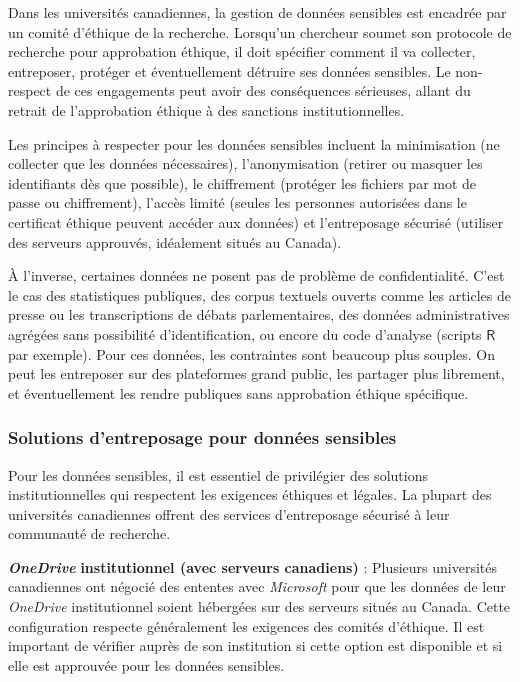 \documentclass[
  letterpaper,
  DIV=11,
  numbers=noendperiod,
  oneside]{scrreprt}
\begin{document}
Dans les universités canadiennes, la gestion de données sensibles est
encadrée par un comité d'éthique de la recherche. Lorsqu'un chercheur
soumet son protocole de recherche pour approbation éthique, il doit
spécifier comment il va collecter, entreposer, protéger et
éventuellement détruire ses données sensibles. Le non-respect de ces
engagements peut avoir des conséquences sérieuses, allant du retrait de
l'approbation éthique à des sanctions institutionnelles.

Les principes à respecter pour les données sensibles incluent la
minimisation (ne collecter que les données nécessaires), l'anonymisation
(retirer ou masquer les identifiants dès que possible), le chiffrement
(protéger les fichiers par mot de passe ou chiffrement), l'accès limité
(seules les personnes autorisées dans le certificat éthique peuvent
accéder aux données) et l'entreposage sécurisé (utiliser des serveurs
approuvés, idéalement situés au Canada).

À l'inverse, certaines données ne posent pas de problème de
confidentialité. C'est le cas des statistiques publiques, des corpus
textuels ouverts comme les articles de presse ou les transcriptions de
débats parlementaires, des données administratives agrégées sans
possibilité d'identification, ou encore du code d'analyse (scripts
\(\textsf{R}\) par exemple). Pour ces données, les contraintes sont
beaucoup plus souples. On peut les entreposer sur des plateformes grand
public, les partager plus librement, et éventuellement les rendre
publiques sans approbation éthique spécifique.

\hypertarget{solutions-dentreposage-pour-donnuxe9es-sensibles}{%
\subsubsection{Solutions d'entreposage pour données
sensibles}\label{solutions-dentreposage-pour-donnuxe9es-sensibles}}

Pour les données sensibles, il est essentiel de privilégier des
solutions institutionnelles qui respectent les exigences éthiques et
légales. La plupart des universités canadiennes offrent des services
d'entreposage sécurisé à leur communauté de recherche.

\textbf{\emph{OneDrive}} \textbf{institutionnel (avec serveurs
canadiens)} : Plusieurs universités canadiennes ont négocié des ententes
avec \emph{Microsoft} pour que les données de leur \emph{OneDrive}
institutionnel soient hébergées sur des serveurs situés au Canada. Cette
configuration respecte généralement les exigences des comités d'éthique.
Il est important de vérifier auprès de son institution si cette option
est disponible et si elle est approuvée pour les données sensibles.
\end{document}

